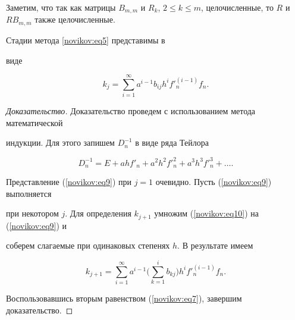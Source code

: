 \smallskip



Заметим, что так как матрицы $B_{m,m}$ и $R_k$,  $2 \leq

k\leq m$, целочисленные, то $R$ и $RB_{m,m}$ также целочисленные.



\smallskip



\begin{lemma}[3] Стадии метода \eqref{novikov:eq5} представимы в

виде

\begin{equation}

\label{novikov:eq9}

k_j= \sum_{i=1}^\infty a^{i-1}b_{ij}h^if'^{(i-1)}_n f_n.

\end{equation}



\end{lemma}



\smallskip



\begin{proof}[Доказательство]

Доказательство проведем с  использованием метода  математической

индукции. Для этого запишем $D^{-1}_n$ в виде ряда Тейлора

\begin{equation}

\label{novikov:eq10}

D^{-1}_n = E+ahf'_n+a^2h^2f'^2_n+a^3h^3f'^3_n+ \ldots.

\end{equation}

Представление (\ref{novikov:eq9}) при $j=1$ очевидно. Пусть (\ref{novikov:eq9}) выполняется

при некотором $j$. Для определения $k_{j+1}$ умножим (\ref{novikov:eq10}) на (\ref{novikov:eq9}) и

соберем слагаемые при одинаковых степенях $h$. В результате имеем

\begin{equation*}

k_{j+1}= \sum_{i=1}^\infty a^{i-1} \biggl(\sum_{k=1}^ib_{kj} \biggr)h^if'^{(i-1)}_nf_n.

\end{equation*}

 Воспользовавшись вторым равенством (\ref{novikov:eq7}), завершим доказательство.

\end{proof}



